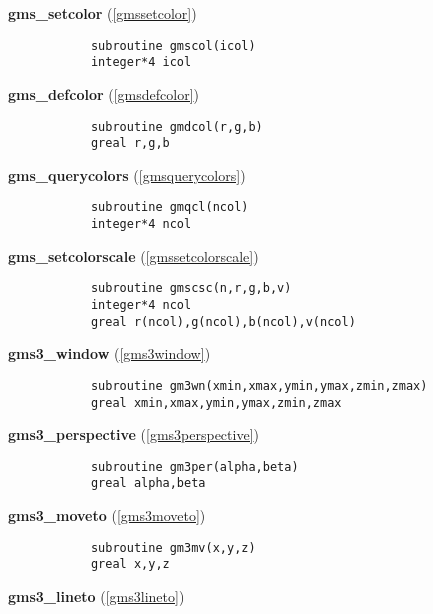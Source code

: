\begin{description}
\item[
{\bf gms\_setcolor} (\ref{gmssetcolor})]\mbox{}


\begin{verbatim}
      subroutine gmscol(icol)
      integer*4 icol
\end{verbatim}


\item[
{\bf gms\_defcolor} (\ref{gmsdefcolor})]\mbox{}


\begin{verbatim}
      subroutine gmdcol(r,g,b)
      greal r,g,b
\end{verbatim}


\item[
{\bf gms\_querycolors} (\ref{gmsquerycolors})]\mbox{}


\begin{verbatim}
      subroutine gmqcl(ncol)
      integer*4 ncol
\end{verbatim}


\item[
{\bf gms\_setcolorscale} (\ref{gmssetcolorscale})]\mbox{}


\begin{verbatim}
      subroutine gmscsc(n,r,g,b,v)
      integer*4 ncol
      greal r(ncol),g(ncol),b(ncol),v(ncol)
\end{verbatim}


\item[
{\bf gms3\_window} (\ref{gms3window})]\mbox{}


\begin{verbatim}
      subroutine gm3wn(xmin,xmax,ymin,ymax,zmin,zmax)
      greal xmin,xmax,ymin,ymax,zmin,zmax
\end{verbatim}


\item[
{\bf gms3\_perspective} (\ref{gms3perspective})]\mbox{}


\begin{verbatim}
      subroutine gm3per(alpha,beta)
      greal alpha,beta
\end{verbatim}


\item[
{\bf gms3\_moveto} (\ref{gms3moveto})]\mbox{}


\begin{verbatim}
      subroutine gm3mv(x,y,z)
      greal x,y,z
\end{verbatim}


\item[
{\bf gms3\_lineto} (\ref{gms3lineto})]\mbox{}



\end{description}

